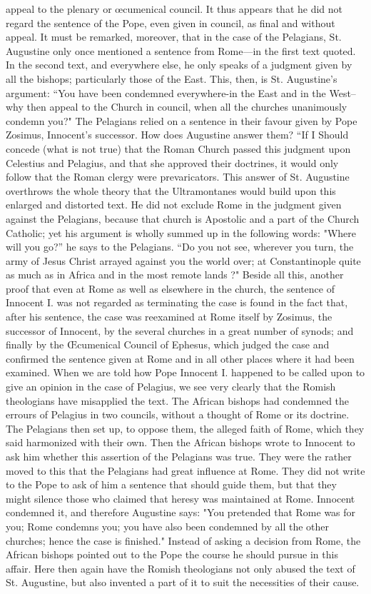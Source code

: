 appeal to the plenary or œcumenical council. It thus appears that he did not regard the sentence of the Pope, even given in council, as final and without appeal. It must be remarked, moreover, that in the case of the Pelagians, St. Augustine only once mentioned a sentence from Rome—in the first text quoted. In the second text, and everywhere else, he only speaks of a judgment given by all the bishops; particularly those of the East. This, then, is St. Augustine's argument: “You have been condemned everywhere-in the East and in the West--why then appeal to the Church in council, when all the churches unanimously condemn you?" The Pelagians relied on a sentence in their favour given by Pope Zosimus, Innocent's successor. How does Augustine answer them? “If I Should concede (what is not true) that the Roman Church passed this judgment upon Celestius and Pelagius, and that she approved their doctrines, it would only follow that the Roman clergy were prevaricators. This answer of St. Augustine overthrows the whole theory that the Ultramontanes would build upon this enlarged and distorted text. He did not exclude Rome in the judgment given against the Pelagians, because that church is Apostolic and a part of the Church Catholic; yet his argument is wholly summed up in the following words: "Where will you go?” he says to the Pelagians. “Do you not see, wherever you turn, the army of Jesus Christ arrayed against you the world over; at Constantinople quite as much as in Africa and in the most remote lands ?" Beside all this, another proof that even at Rome as well as elsewhere in the church, the sentence of Innocent I. was not regarded as terminating the case is found in the fact that, after his sentence, the case was reexamined at Rome itself by Zosimus, the successor of Innocent, by the several churches in a great number of synods; and finally by the Œcumenical Council of Ephesus, which judged the case and confirmed the sentence given at Rome and in all other places where it had been examined. When we are told how Pope Innocent I. happened to be called upon to give an opinion in the case of Pelagius, we see very clearly that the Romish theologians have misapplied the text. The African bishops had condemned the errours of Pelagius in two councils, without a thought of Rome or its doctrine. The Pelagians then set up, to oppose them, the alleged faith of Rome, which they said harmonized with their own. Then the African bishops wrote to Innocent to ask him whether this assertion of the Pelagians was true. They were the rather moved to this that the Pelagians had great influence at Rome. They did not write to the Pope to ask of him a sentence that should guide them, but that they might silence those who claimed that heresy was maintained at Rome. Innocent condemned it, and therefore Augustine says: "You pretended that Rome was for you; Rome condemns you; you have also been condemned by all the other churches; hence the case is finished." Instead of asking a decision from Rome, the African bishops pointed out to the Pope the course he should pursue in this affair. Here then again have the Romish theologians not only abused the text of St. Augustine, but also invented a part of it to suit the necessities of their cause.

